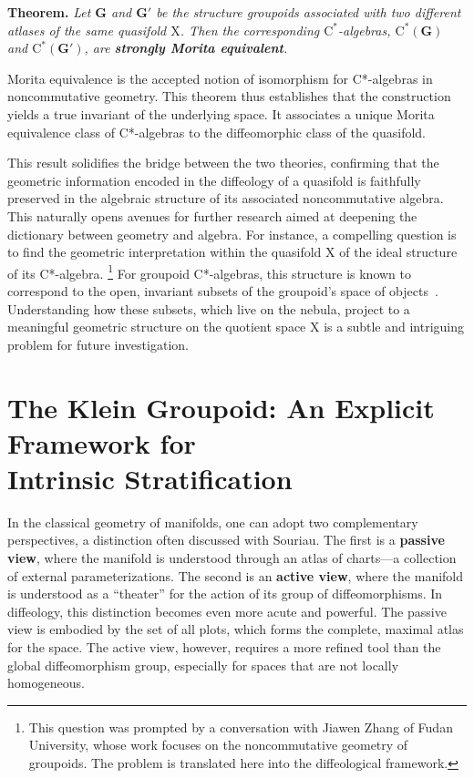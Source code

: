 \documentclass[10pt,reqno,letterpaper,twoside]{amsart}
\theoremstyle{article}
\newenvironment{theorem}[1]%
{\noindent\textbf{Theorem#1.} \it}%
{}
\newcommand{\GG}{\mathbf{G}}
\def \C{\mathrm C}
\def \X{\mathrm X}
\begin{document}
  \begin{theorem}{}
    Let $\GG$ and $\GG'$ be the structure groupoids associated with two different atlases of the same quasifold $\X$.
    Then the corresponding $\C^*$-algebras,
    $\C^*(\GG)$ and $\C^*(\GG')$,
    are \textbf{strongly Morita equivalent}.
  \end{theorem}
  
  Morita equivalence is the accepted notion of isomorphism for C*-algebras in noncommutative geometry.
  This theorem thus establishes that the construction yields a true invariant of the underlying space.
  It associates a unique Morita equivalence class of C*-algebras to the diffeomorphic class of the quasifold.
  
  This result solidifies the bridge between the two theories,
  confirming that the geometric information encoded in the diffeology of a quasifold is faithfully preserved in the algebraic structure of its associated noncommutative algebra.
  This naturally opens avenues for further research aimed at deepening the dictionary between geometry and algebra.
  For instance,
  a compelling question is to find the geometric interpretation within the quasifold $\X$ of the ideal structure of its C*-algebra.%
  \footnote{This question was prompted by a conversation with Jiawen Zhang of Fudan University, whose work focuses on the noncommutative geometry of groupoids. The problem is translated here into the diffeological framework.}
  For groupoid C*-algebras,
  this structure is known to correspond to the open,
  invariant subsets of the groupoid's space of objects~\cite{Ren80}.
  Understanding how these subsets,
  which live on the nebula,
  project to a meaningful geometric structure on the quotient space $\X$ is a subtle and intriguing problem for future investigation.
  
  
  \section{The Klein Groupoid:  An Explicit Framework for \\ Intrinsic Stratification}
  
  In the classical geometry of manifolds,
  one can adopt two complementary perspectives,
  a distinction often discussed with Souriau.
  The first is a \textbf{passive view},
  where the manifold is understood through an atlas of charts—a collection of external parameterizations.
  The second is an \textbf{active view},
  where the manifold is understood as a ``theater'' for the action of its group of diffeomorphisms.
  In diffeology,
  this distinction becomes even more acute and powerful.
  The passive view is embodied by the set of all plots,
  which forms the complete,
  maximal atlas for the space.
  The active view,
  however,
  requires a more refined tool than the global diffeomorphism group,
  especially for spaces that are not locally homogeneous.
  
\end{document}
